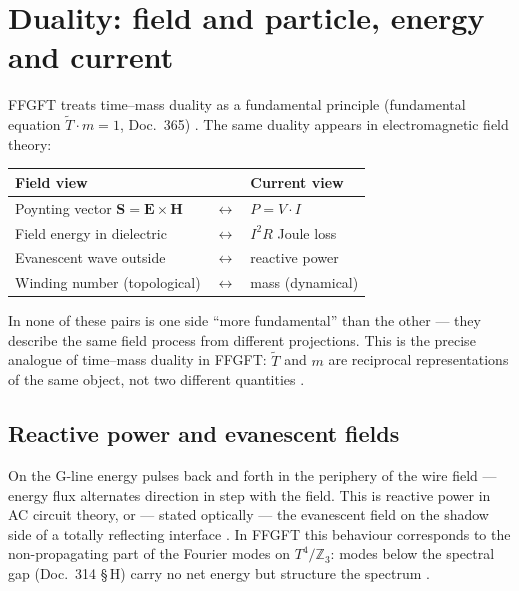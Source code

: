 \section{Duality: field and particle, energy and current}

FFGFT treats time--mass duality as a fundamental principle (fundamental
equation $\tilde{T}\cdot m=1$, Doc.~365) \SetzM. The same duality appears
in electromagnetic field theory:

\begin{center}
\begin{tabular}{@{}lll@{}}
\toprule
\textbf{Field view} & & \textbf{Current view} \\
\midrule
Poynting vector $\mathbf{S} = \mathbf{E}\times\mathbf{H}$ & $\longleftrightarrow$ & $P = V \cdot I$ \\
Field energy in dielectric & $\longleftrightarrow$ & $I^2 R$ Joule loss \\
Evanescent wave outside & $\longleftrightarrow$ & reactive power \\
Winding number (topological) & $\longleftrightarrow$ & mass (dynamical) \\
\bottomrule
\end{tabular}
\end{center}

In none of these pairs is one side ``more fundamental'' than the other ---
they describe the same field process from different projections. This is
the precise analogue of time--mass duality in FFGFT: $\tilde{T}$ and $m$
are reciprocal representations of the same object, not two different
quantities \KM.

\subsection*{Reactive power and evanescent fields}

On the G-line energy pulses back and forth in the periphery of the wire
field --- energy flux alternates direction in step with the field. This is
reactive power in AC circuit theory, or --- stated optically --- the
evanescent field on the shadow side of a totally reflecting interface \EM.
In FFGFT this behaviour corresponds to the non-propagating part of the
Fourier modes on $T^4/\mathbb{Z}_3$: modes below the spectral gap
(Doc.~314 \S\,H) carry no net energy but structure the spectrum \SM.

